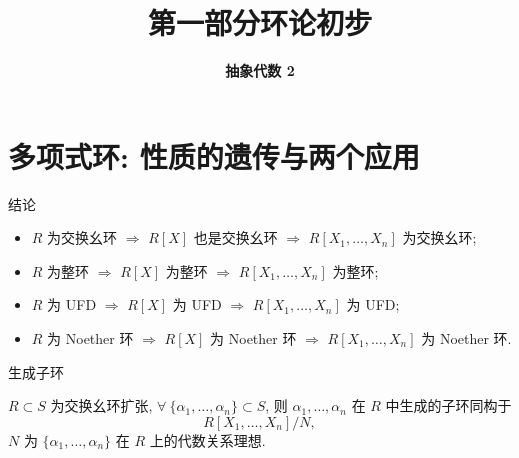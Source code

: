 \everymath{\displaystyle}



\title[第一部分\\
环论初步]{\texorpdfstring{\LARGE \bfseries 第一部分\quad 环论初步}{第一部分 环论初步}}
\author[抽象代数 2]{\Large \bfseries 抽象代数 2}
\date{}





\begin{frame}

\titlepage %

\end{frame}


\section[多项式环]{多项式环: 性质的遗传与两个应用}


\begin{frame}{结论}

\begin{itemize}
\item[(i)] $R$ 为交换幺环 $\Longrightarrow$ $R[X]$ 也是交换幺环
  $\Longrightarrow$ $R[X_1, \dots, X_n]$ 为交换幺环;
\item[(ii)] $R$ 为整环 $\Longrightarrow$ $R[X]$ 为整环
  $\Longrightarrow$ $R[X_1, \dots, X_n]$ 为整环;
\item[(iii)] $R$ 为 UFD $\Longrightarrow$ $R[X]$ 为 UFD
  $\Longrightarrow$ $R[X_1, \dots, X_n]$ 为 UFD;
\item[(iv)] $R$ 为 Noether 环 $\Longrightarrow$ $R[X]$ 为 Noether 环
  $\Longrightarrow$ $R[X_1, \dots, X_n]$ 为 Noether 环.
\end{itemize}

\end{frame}


\begin{frame}{生成子环}

\begin{prop}[生成子环]
$R \subset S$ 为交换幺环扩张,
$\forall\ \{\alpha_1, \dots, \alpha_n\} \subset S$, 则 $\alpha_1, \dots, \alpha_n$
在 $R$ 中生成的子环同构于
\[
R[X_1, \dots, X_n] \big/ N,
\]
$N$ 为 $\{\alpha_1, \dots, \alpha_n\}$ 在 $R$ 上的代数关系理想.
\end{prop}

\end{frame}

